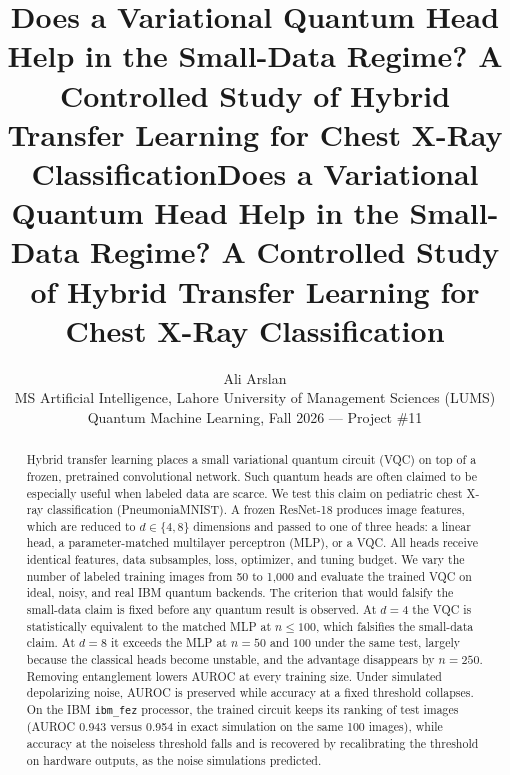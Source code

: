 \documentclass[conference]{IEEEtran}
\newcommand{\usingieee}{}
\begin{document}
\ifdefined\usingieee
\title{Does a Variational Quantum Head Help in the Small-Data Regime?
A Controlled Study of Hybrid Transfer Learning for Chest X-Ray Classification}
\author{
}
\maketitle
\else
\title{\vspace{-1.2em}\Large\bfseries Does a Variational Quantum Head Help in the Small-Data Regime?
A Controlled Study of Hybrid Transfer Learning for Chest X-Ray Classification}
\author{Ali Arslan\\ \small MS Artificial Intelligence, Lahore University of Management Sciences (LUMS)\\
\small Quantum Machine Learning, Fall 2026 --- Project \#11}
\date{\vspace{-2em}}
\maketitle
\fi

\begin{abstract}
Hybrid transfer learning places a small variational quantum circuit (VQC)
on top of a frozen, pretrained convolutional network. Such quantum heads are
often claimed to be especially useful when labeled data are scarce. We test
this claim on pediatric chest X-ray classification (PneumoniaMNIST). A frozen
ResNet-18 produces image features, which are reduced to $d\in\{4,8\}$
dimensions and passed to one of three heads: a linear head, a
parameter-matched multilayer perceptron (MLP), or a VQC. All heads receive
identical features, data subsamples, loss, optimizer, and tuning budget. We
vary the number of labeled training images from 50 to 1{,}000 and evaluate
the trained VQC on ideal, noisy, and real IBM quantum backends. The
criterion that would falsify the small-data claim is fixed before any
quantum result is observed. At $d=4$ the VQC is statistically equivalent
to the matched MLP at $n\le100$, which falsifies the small-data claim. At
$d=8$ it exceeds the MLP at $n=50$ and $100$ under the same test, largely
because the classical heads become unstable, and the advantage disappears
by $n=250$. Removing entanglement lowers AUROC at every training size.
Under simulated depolarizing noise, AUROC is preserved while accuracy at a
fixed threshold collapses. On the IBM \texttt{ibm\_fez} processor, the
trained circuit keeps its ranking of test images (AUROC 0.943 versus 0.954
in exact simulation on the same 100 images), while accuracy at the
noiseless threshold falls and is recovered by recalibrating the threshold
on hardware outputs, as the noise simulations predicted.
\end{abstract}
\end{document}
